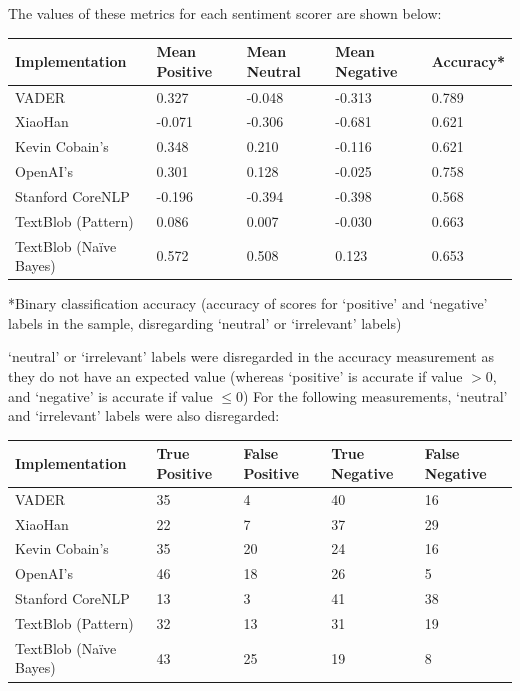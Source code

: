 \documentclass{report}
\begin{document}
The values of these metrics for each sentiment scorer are shown below: 

\vspace{0.5em}
\noindent
\begin{tabu} to \textwidth { | X[c] | X[c] | X[c] | X[c] | X[c] | }
	\hline
	Implementation & Mean Positive & Mean Neutral & Mean Negative & Accuracy* \\
	\hline
	VADER \cite{VADER} & 0.327 & -0.048 & -0.313 & 0.789 \\
	\hline
	XiaoHan \cite{kalchbrennerACL2014} & -0.071 & -0.306 & -0.681 & 0.621 \\
	\hline
	Kevin Cobain's \cite{kevincobain} & 0.348 & 0.210 & -0.116 & 0.621 \\
	\hline
	OpenAI's \cite{OpenAI} & 0.301 & 0.128 & -0.025 & 0.758 \\
	\hline
	Stanford CoreNLP \cite{StanfordNLP} & -0.196 & -0.394 & -0.398 & 0.568 \\
	\hline
	TextBlob \cite{textblob} (Pattern) & 0.086 & 0.007 & -0.030 & 0.663 \\
	\hline
	TextBlob \cite{textblob} (Na\"{i}ve Bayes) & 0.572 & 0.508 & 0.123 & 0.653 \\
	\hline
\end{tabu}

\vspace{0.2em}
*Binary classification accuracy (accuracy of scores for `positive' and `negative' labels in the sample, disregarding `neutral' or `irrelevant' labels)

`neutral' or `irrelevant' labels were disregarded in the accuracy measurement as they do not have an expected value (whereas `positive' is accurate if value $>$0, and `negative' is accurate if value $\le$0)
For the following measurements, `neutral' and `irrelevant' labels were also disregarded:

\vspace{0.5em}
\noindent
\begin{tabu} to \textwidth { | X[c] | X[c] | X[c] | X[c] | X[c] |}
	\hline
	Implementation & True Positive & False Positive & True Negative & False Negative \\
	\hline
	VADER \cite{VADER} & 35 & 4 & 40 & 16 \\
	\hline
	XiaoHan \cite{kalchbrennerACL2014} & 22 & 7 & 37 & 29 \\
	\hline
	Kevin Cobain's \cite{kevincobain} & 35 & 20 & 24 & 16 \\
	\hline
	OpenAI's \cite{OpenAI} & 46 & 18 & 26 & 5 \\
	\hline
	Stanford CoreNLP \cite{StanfordNLP} & 13 & 3 & 41 & 38 \\
	\hline
	TextBlob \cite{textblob} (Pattern) & 32 & 13 & 31 & 19 \\
	\hline
	TextBlob \cite{textblob} (Na\"{i}ve Bayes) & 43 & 25 & 19 & 8 \\
	\hline
\end{tabu}
\vspace{0.5em}
	
\end{document}

